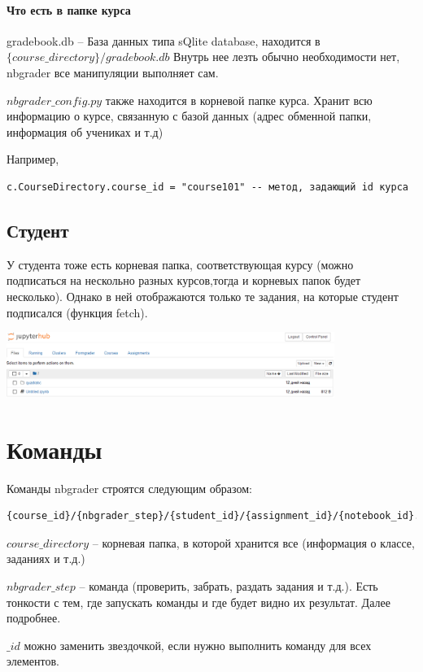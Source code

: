 \documentclass[a4paper,12pt]{article}
\begin{document}
\paragraph{Что есть в папке курса}

gradebook.db --  База данных типа sQlite database, находится в $\{course\_directory\}/gradebook.db$
Внутрь нее лезть обычно необходимости нет, nbgrader все манипуляции выполняет сам. 

$nbgrader\_config.py$ также находится в корневой папке курса. Хранит всю информацию о курсе, связанную с базой данных (адрес обменной папки, информация об учениках и т.д)

Например, 
\begin{verbatim}
c.CourseDirectory.course_id = "course101" -- метод, задающий id курса
\end{verbatim}

\subsection{Студент}
У студента тоже есть корневая папка, соответствующая курсу (можно подписаться на нескольно разных курсов,тогда и корневых папок будет несколько). Однако в ней отображаются только те задания, на которые студент подписался (функция fetch). 

\includegraphics[width=0.8\textwidth]{student_root_directory}

\section{Команды}

Команды nbgrader строятся следующим образом:
\begin{verbatim}
{course_id}/{nbgrader_step}/{student_id}/{assignment_id}/{notebook_id}.ipynb
\end{verbatim}

$course\_directory$ -- корневая папка, в которой хранится все (информация о классе, заданиях и т.д.)

$nbgrader\_step$ -- команда (проверить, забрать, раздать задания и т.д.). Есть тонкости с тем, где запускать команды и где будет видно их результат. Далее подробнее.

$\_id$ можно заменить звездочкой, если нужно выполнить команду для всех элементов.
\end{document}
